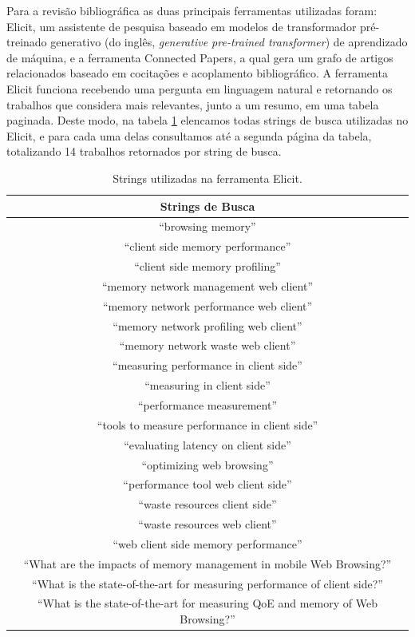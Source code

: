 \documentclass[12pt]{tcc}
\begin{document}
	Para a revisão bibliográfica as duas principais ferramentas utilizadas foram: Elicit, um assistente de pesquisa baseado em modelos de transformador pré-treinado generativo (do inglês, \emph{generative pre-trained transformer}) de aprendizado de máquina, e a ferramenta Connected Papers, a qual  gera um grafo de artigos relacionados baseado em cocitações e acoplamento bibliográfico.
	A ferramenta Elicit funciona recebendo uma pergunta em linguagem natural e retornando os trabalhos que considera mais relevantes, junto a um resumo, em uma tabela paginada.
	Deste modo, na tabela \ref{tab:strings-elicit} elencamos todas strings de busca utilizadas no Elicit, e para cada uma delas consultamos até a segunda página da tabela, totalizando 14 trabalhos retornados por string de busca.

	\begin{table}[h!]
	\centering
	\caption{Strings utilizadas na ferramenta Elicit.\label{long}}

	\begin{tabular}{||c||} 
		
	\hline
		Strings de Busca \\
	\hline\hline
	``browsing memory'' \\
	``client side memory performance'' \\
	``client side memory profiling'' \\
	``memory network management web client'' \\
	``memory network performance web client'' \\
	``memory network profiling web client'' \\
	``memory network waste web client'' \\
	``measuring performance in client side'' \\
	``measuring in client side'' \\
	``performance measurement'' \\
	``tools to measure performance in client side'' \\
	``evaluating latency on client side'' \\
	``optimizing web browsing'' \\
	``performance tool web client side'' \\
	``waste resources client side'' \\
	``waste resources web client'' \\
	``web client side memory performance'' \\
	``What are the impacts of memory management in mobile Web Browsing?'' \\
	``What is the state-of-the-art for measuring performance of client side?'' \\
	``What is the state-of-the-art for measuring QoE and memory of Web Browsing?'' \\

	\hline
	\end{tabular}
	\label{tab:strings-elicit}
	\end{table}
\end{document}
